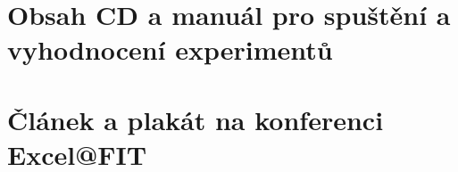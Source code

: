 \chapter{Obsah CD a manuál pro spuštění a vyhodnocení experimentů}

\chapter{Článek a plakát na konferenci Excel@FIT}
\newpage
\begin{figure}[!ht]
	\centering 
	
\end{figure}
\newpage
\begin{figure}[!ht]
	\centering 
	
\end{figure}
\newpage
\begin{figure}[!ht]
	\centering 
	
\end{figure}
\newpage
\begin{figure}[!ht]
	\centering 
	
\end{figure}
\newpage
\begin{figure}[!ht]
	\centering 
	
\end{figure}
\newpage
\begin{figure}[!ht]
	\centering 
	
\end{figure}

